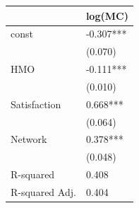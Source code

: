 \begin{tabular}{ll}
\hline
               & log(MC)    \\
\hline
const          & -0.307***  \\
               & (0.070)    \\
HMO            & -0.111***  \\
               & (0.010)    \\
Satisfaction   & 0.668***   \\
               & (0.064)    \\
Network        & 0.378***   \\
               & (0.048)    \\
R-squared      & 0.408      \\
R-squared Adj. & 0.404      \\
\hline
\end{tabular}